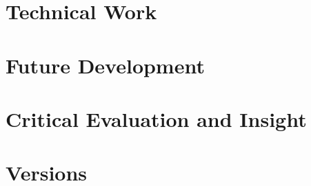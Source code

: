 \documentclass{article}
\begin{document}
	\clearpage
	\section{Technical Work}
	
	\clearpage
	\section{Future Development}
	
	\clearpage
	\section{Critical Evaluation and Insight}
	
	\clearpage
    \section{Versions}
\end{document}
